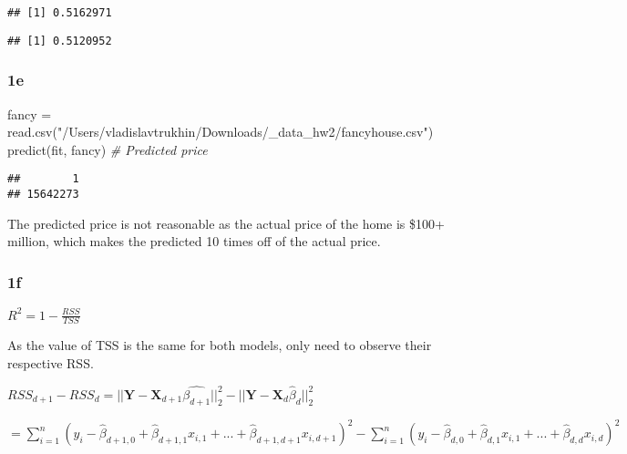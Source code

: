 \documentclass[
]{article}
\newenvironment{Shaded}{\begin{snugshade}}{\end{snugshade}}
\newcommand{\CommentTok}[1]{\textcolor[rgb]{0.56,0.35,0.01}{\textit{#1}}}
\newcommand{\DecValTok}[1]{\textcolor[rgb]{0.00,0.00,0.81}{#1}}
\newcommand{\FunctionTok}[1]{\textcolor[rgb]{0.00,0.00,0.00}{#1}}
\newcommand{\NormalTok}[1]{#1}
\newcommand{\OtherTok}[1]{\textcolor[rgb]{0.56,0.35,0.01}{#1}}
\newcommand{\SpecialCharTok}[1]{\textcolor[rgb]{0.00,0.00,0.00}{#1}}
\newcommand{\StringTok}[1]{\textcolor[rgb]{0.31,0.60,0.02}{#1}}
\begin{document}
\begin{verbatim}
## [1] 0.5162971
\end{verbatim}

\begin{Shaded}
\end{Shaded}

\begin{verbatim}
## [1] 0.5120952
\end{verbatim}

\hypertarget{e}{%
\subsubsection{1e}\label{e}}

\begin{Shaded}
\begin{Highlighting}[]
\NormalTok{fancy }\OtherTok{=} \FunctionTok{read.csv}\NormalTok{(}\StringTok{"/Users/vladislavtrukhin/Downloads/\_data\_hw2/fancyhouse.csv"}\NormalTok{)}
\FunctionTok{predict}\NormalTok{(fit, fancy) }\CommentTok{\# Predicted price}
\end{Highlighting}
\end{Shaded}

\begin{verbatim}
##        1 
## 15642273
\end{verbatim}

The predicted price is not reasonable as the actual price of the home is
\$100+ million, which makes the predicted 10 times off of the actual
price.

\hypertarget{f}{%
\subsubsection{1f}\label{f}}

\(R^2 = 1-\frac{RSS}{TSS}\)

As the value of TSS is the same for both models, only need to observe
their respective RSS.

\(RSS_{d+1} - RSS_d = ||\textbf{Y} - \textbf{X}_{d+1}\hat{\beta_{d+1}}||^2_2 - ||\textbf{Y} - \textbf{X}_d\hat{\beta}_d||^2_2\)

\(= \sum^n_{i=1}(y_i-\hat{\beta}_{d+1,0}+\hat{\beta}_{d+1, 1}x_{i,1}+...+\hat{\beta}_{d+1, d+1}x_{i,d+1})^2 - \sum^n_{i=1}(y_i-\hat{\beta}_{d,0}+\hat{\beta}_{d, 1}x_{i,1}+...+\hat{\beta}_{d, d}x_{i,d})^2\)
\end{document}
